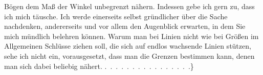%
Bögen dem Maß der Winkel unbegrenzt nähern. Indessen gebe ich gern zu, dass ich mich täusche. Ich werde einerseits selbst gründlicher über die Sache nachdenken, andererseits und vor allem den Augenblick erwarten, in dem Sie mich mündlich belehren können. Warum man bei Linien nicht wie bei Größen im Allgemeinen Schlüsse ziehen soll, die sich auf endlos wachsende Linien stützen, sehe ich nicht ein, vorausgesetzt, dass man die Grenzen bestimmen kann, denen man sich dabei beliebig nähert. \mbox{.\ .\ .\ .\ .\ .\ .\ .\ .\ .\ .\ .\ .\ .\ .\ .}\}
